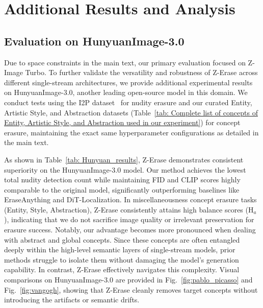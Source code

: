 \section{Additional Results and Analysis}
\label{appendix: Additional Results and Analysis hunyuan}

\subsection{Evaluation on HunyuanImage-3.0}

Due to space constraints in the main text, our primary evaluation focused on Z-Image Turbo. To further validate the versatility and robustness of Z-Erase across different single-stream architectures, we provide additional experimental results on HunyuanImage-3.0, another leading open-source model in this domain. We conduct tests using the I2P dataset~\cite{sld} for nudity erasure and our curated Entity, Artistic Style, and Abstraction datasets (Table~\ref{tab: Complete list of concepts of Entity, Artistic Style, and Abstraction used in our experiment}) for concept erasure, maintaining the exact same hyperparameter configurations as detailed in the main text.

As shown in Table~\ref{tab: Hunyuan_results}, Z-Erase demonstrates consistent superiority on the HunyuanImage-3.0 model. Our method achieves the lowest total nudity detection count while maintaining FID and CLIP scores highly comparable to the original model, significantly outperforming baselines like EraseAnything and DiT-Localization. In miscellaneousness concept erasure tasks (Entity, Style, Abstraction), Z-Erase consistently attains high balance scores (\textsc{H$_a$}), indicating that we do not sacrifice image quality or irrelevant preservation for erasure success. Notably, our advantage becomes more pronounced when dealing with abstract and global concepts. Since these concepts are often entangled deeply within the high-level semantic layers of single-stream models, prior methods struggle to isolate them without damaging the model's generation capability. In contrast, Z-Erase effectively navigates this complexity. Visual comparisons on HunyuanImage-3.0 are provided in Fig.~\ref{fig:pablo_picasso} and Fig.~\ref{fig:vangogh}, showing that Z-Erase cleanly removes target concepts without introducing the artifacts or semantic drifts.


